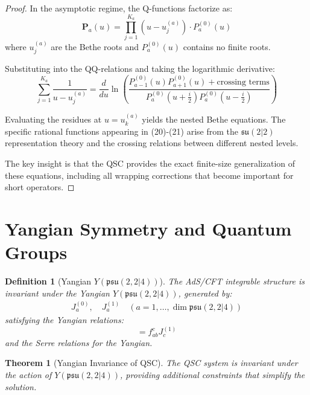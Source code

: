 \documentclass[11pt]{article}
\newtheorem{theorem}{Theorem}
\newtheorem{definition}{Definition}
\begin{document}
\begin{proof}
In the asymptotic regime, the Q-functions factorize as:
\begin{equation}
\mathbf{P}_a(u) = \prod_{j=1}^{K_a} (u - u_j^{(a)}) \cdot P_a^{(0)}(u)
\end{equation}
where $u_j^{(a)}$ are the Bethe roots and $P_a^{(0)}(u)$ contains no finite roots.

Substituting into the QQ-relations and taking the logarithmic derivative:
\begin{equation}
\sum_{j=1}^{K_a} \frac{1}{u - u_j^{(a)}} = \frac{d}{du} \ln\left(\frac{P_{a-1}^{(0)}(u) P_{a+1}^{(0)}(u) + \text{crossing terms}}{P_a^{(0)}(u+\frac{i}{2}) P_a^{(0)}(u-\frac{i}{2})}\right)
\end{equation}

Evaluating the residues at $u = u_k^{(a)}$ yields the nested Bethe equations. The specific rational functions appearing in (20)-(21) arise from the $\mathfrak{su}(2|2)$ representation theory and the crossing relations between different nested levels.

The key insight is that the QSC provides the exact finite-size generalization of these equations, including all wrapping corrections that become important for short operators.
\end{proof}

\section{Yangian Symmetry and Quantum Groups}

\begin{definition}[Yangian $Y(\mathfrak{psu}(2,2|4))$]
The AdS/CFT integrable structure is invariant under the Yangian $Y(\mathfrak{psu}(2,2|4))$, generated by:
\begin{align}
J_a^{(0)}, \quad J_a^{(1)} \quad (a = 1, \ldots, \dim \mathfrak{psu}(2,2|4))
\end{align}
satisfying the Yangian relations:
\begin{equation}
[J_a^{(1)}, J_b^{(0)}] = f_{ab}^c J_c^{(1)}
\end{equation}
and the Serre relations for the Yangian.
\end{definition}

\begin{theorem}[Yangian Invariance of QSC]
The QSC system is invariant under the action of $Y(\mathfrak{psu}(2,2|4))$, providing additional constraints that simplify the solution.
\end{theorem}
\end{document}
